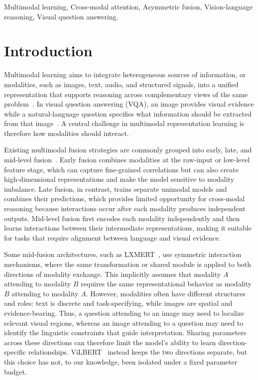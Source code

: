 \documentclass[conference]{IEEEtran}
\begin{document}
\begin{IEEEkeywords}
Multimodal learning, Cross-modal attention, Asymmetric fusion, Vision-language reasoning, Visual question answering.
\end{IEEEkeywords}

\section{Introduction}
Multimodal learning aims to integrate heterogeneous sources of information, or modalities, such as images, text, audio, and structured signals, into a unified representation that supports reasoning across complementary views of the same problem~\cite{baltrusaitis2019multimodal,ramachandram2017deep}. In visual question answering (VQA), an image provides visual evidence while a natural-language question specifies what information should be extracted from that image~\cite{antol2015vqa,goyal2017making}. A central challenge in multimodal representation learning is therefore how modalities should interact.

Existing multimodal fusion strategies are commonly grouped into early, late, and mid-level fusion~\cite{baltrusaitis2019multimodal,ramachandram2017deep}. Early fusion combines modalities at the raw-input or low-level feature stage, which can capture fine-grained correlations but can also create high-dimensional representations and make the model sensitive to modality imbalance. Late fusion, in contrast, trains separate unimodal models and combines their predictions, which provides limited opportunity for cross-modal reasoning because interactions occur after each modality produces independent outputs. Mid-level fusion first encodes each modality independently and then learns interactions between their intermediate representations, making it suitable for tasks that require alignment between language and visual evidence.

Some mid-fusion architectures, such as LXMERT~\cite{tan2019lxmert}, use symmetric interaction mechanisms, where the same transformation or shared module is applied to both directions of modality exchange. This implicitly assumes that modality $A$ attending to modality $B$ requires the same representational behavior as modality $B$ attending to modality $A$. However, modalities often have different structures and roles: text is discrete and task-specifying, while images are spatial and evidence-bearing. Thus, a question attending to an image may need to localize relevant visual regions, whereas an image attending to a question may need to identify the linguistic constraints that guide interpretation. Sharing parameters across these directions can therefore limit the model's ability to learn direction-specific relationships. ViLBERT~\cite{lu2019vilbert} instead keeps the two directions separate, but this choice has not, to our knowledge, been isolated under a fixed parameter budget.
\end{document}
